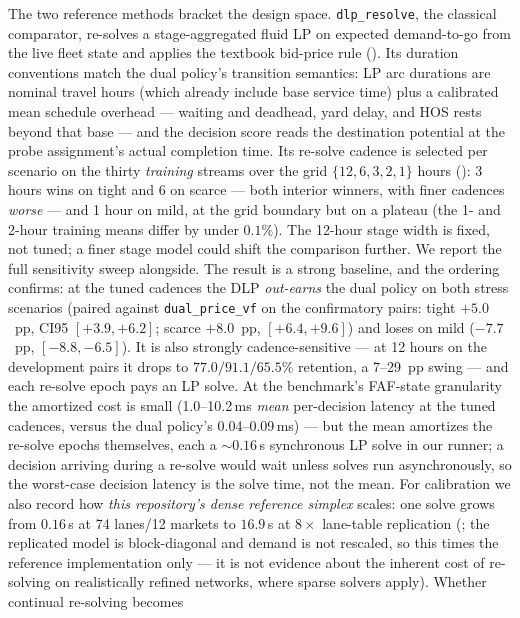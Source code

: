 \documentclass[11pt]{article}
\begin{document}
The two reference methods bracket the design space.
\texttt{dlp\_resolve}, the classical comparator, re-solves a
stage-aggregated fluid LP on expected demand-to-go from the live fleet
state and applies the textbook bid-price rule
(). Its duration conventions match
the dual policy's transition semantics: LP arc durations are nominal
travel hours (which already include base service time) plus a
calibrated mean schedule overhead --- waiting and deadhead, yard
delay, and HOS rests beyond that base --- and the decision score
reads the destination potential at the probe assignment's actual
completion time. Its re-solve cadence is selected per scenario on the thirty
\emph{training} streams over the grid $\{12, 6, 3, 2, 1\}$ hours
(): 3 hours wins on tight and
6 on scarce --- both interior winners, with finer cadences
\emph{worse} --- and 1 hour on mild, at the grid boundary but on a
plateau (the 1- and 2-hour training means differ by under $0.1\%$).
The 12-hour stage width is fixed, not tuned; a finer stage model
could shift the comparison further. We report the full sensitivity
sweep alongside. The result is a strong baseline, and the ordering
confirms: at the tuned
cadences the DLP \emph{out-earns} the dual policy on both stress
scenarios (paired against \texttt{dual\_price\_vf} on the
confirmatory pairs: tight
$+5.0$~pp, CI95 $[+3.9, +6.2]$; scarce $+8.0$~pp, $[+6.4, +9.6]$) and
loses on mild ($-7.7$~pp, $[-8.8, -6.5]$). It is also strongly
cadence-sensitive --- at 12 hours on the development pairs it drops
to $77.0/91.1/65.5\%$
retention, a 7--29~pp swing --- and each re-solve epoch pays an LP
solve. At the
benchmark's FAF-state granularity the amortized cost is small
(1.0--10.2\,ms \emph{mean} per-decision latency at the tuned
cadences, versus the dual policy's 0.04--0.09\,ms) --- but the mean
amortizes the re-solve epochs themselves, each a ${\sim}0.16$\,s
synchronous LP solve in our runner; a decision arriving during a
re-solve would wait unless solves run asynchronously, so the
worst-case decision latency is the solve time, not the mean. For calibration we also record how
\emph{this repository's dense reference simplex} scales: one solve
grows from $0.16$\,s at 74 lanes/12 markets to $16.9$\,s at
$8\times$ lane-table replication
(; the replicated model is
block-diagonal and demand is not rescaled, so this times the
reference implementation only --- it is not evidence about the
inherent cost of re-solving on realistically refined networks, where
sparse solvers apply). Whether continual re-solving becomes
\end{document}
